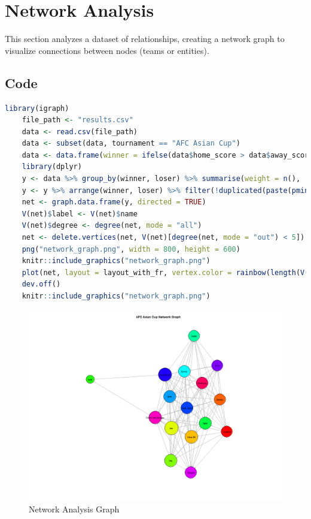 \documentclass[12pt]{article}
\begin{document}
	
	\newpage
	
	\section{Network Analysis}
	This section analyzes a dataset of relationships, creating a network graph to visualize connections between nodes (teams or entities).
	\subsection*{Code}
	\begin{lstlisting}[language=R]
	library(igraph)
	file_path <- "results.csv"
	data <- read.csv(file_path)
	data <- subset(data, tournament == "AFC Asian Cup")
	data <- data.frame(winner = ifelse(data$home_score > data$away_score, data$home_team, data$away_team), loser = ifelse(data$home_score > data$away_score, data$away_team, data$home_team), date = as.Date(data$date))
	library(dplyr)
	y <- data %>% group_by(winner, loser) %>% summarise(weight = n(), .groups = 'drop')
	y <- y %>% arrange(winner, loser) %>% filter(!duplicated(paste(pmin(winner, loser), pmax(winner, loser))))
	net <- graph.data.frame(y, directed = TRUE)
	V(net)$label <- V(net)$name
	V(net)$degree <- degree(net, mode = "all")
	net <- delete.vertices(net, V(net)[degree(net, mode = "out") < 5])
	png("network_graph.png", width = 800, height = 600)
	knitr::include_graphics("network_graph.png")
	plot(net, layout = layout_with_fr, vertex.color = rainbow(length(V(net))), vertex.size = log(V(net)$degree + 1) * 6, edge.arrow.size = 0.3, vertex.label.cex = 0.8, vertex.label.color = "black", main = "AFC Asian Cup Network Graph")
	dev.off()
	knitr::include_graphics("network_graph.png")
	\end{lstlisting}
	
	\begin{figure}[H]
		\centering
		\includegraphics[width=1\textwidth]{network_graph.png}
		\caption{Network Analysis Graph}
	\end{figure}
	
\end{document}
